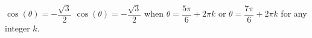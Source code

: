 {$\cos(\theta) = -\dfrac{\sqrt{3}}{2}$}
{$\cos(\theta) = -\dfrac{\sqrt{3}}{2}$ when $\theta = \dfrac{5\pi}{6} + 2\pi k$ or $\theta = \dfrac{7\pi}{6} + 2\pi k$ for any integer $k$.}